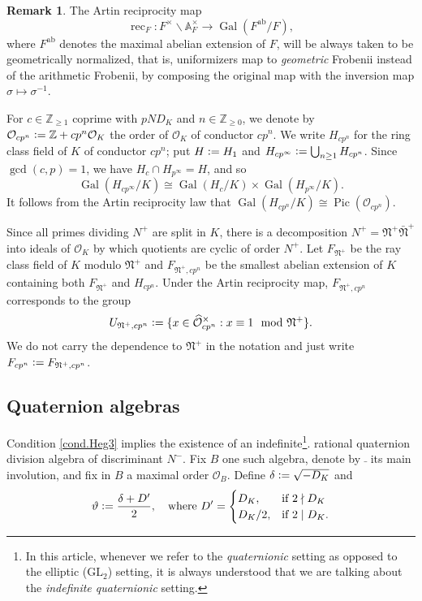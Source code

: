 \documentclass[a4paper]{amsart}
\makeatletter
\numberwithin{equation}{section}
\newcommand{\smallbullet}{}
\DeclareRobustCommand\smallbullet{
  \mathord{\mathpalette\smallbullet@{0.5}}
}
\newcommand{\smallbullet@}[2]{
  \vcenter{\hbox{\scalebox{#2}{$\m@th#1\bullet$}}}
}
\theoremstyle{definition}
\newtheorem{remark}[theorem]{Remark}
\newcommand{\Z}{\mathbb{Z}}
\newcommand{\A}{\mathbb{A}}
\newcommand{\defeq}{\vcentcolon=}
\DeclareMathOperator{\Pic}{Pic}
\DeclareMathOperator{\Gal}{Gal}
\makeatother
\begin{document}
\begin{remark}\label{rem.Reciprocity}
The Artin reciprocity map \[\operatorname{rec}_F\colon F^\times\backslash\A_F^\times\longrightarrow\Gal(F^{\mathrm{ab}}/F),\] where $F^\mathrm{ab}$ denotes the maximal abelian extension of $F$, will be always taken to be geometrically normalized, that is, uniformizers map to \textit{geometric} Frobenii instead of the arithmetic Frobenii, by composing the original map with the inversion map $\sigma\mapsto\sigma^{-1}$.
\end{remark}

For $c\in\Z_{\ge 1}$ coprime with $pND_K$ and $n\in\Z_{\ge 0}$, we denote by $\mathcal{O}_{cp^n}\defeq\Z +cp^n\mathcal{O}_K$ the order of $\mathcal{O}_K$ of conductor $cp^n$. We write $H_{cp^n}$ for the ring class field of $K$ of conductor $cp^n$; put $H\defeq H_{1}$ and $H_{cp^\infty}\defeq\bigcup_{n\ge 1}H_{cp^n}$.
Since $\gcd(c,p)=1$, we have $H_c\cap H_{p^\infty}=H$, and so \[\Gal(H_{cp^\infty}/K)\cong\Gal(H_c/K)\times\Gal(H_{p^\infty}/K).\] It follows from the Artin reciprocity law that $\Gal(H_{cp^n}/K)\cong\Pic(\mathcal{O}_{cp^n}).$

Since all primes dividing $N^+$ are split in $K$, there is a decomposition $N^+=\mathfrak{N}^+\bar{\mathfrak{N}}^+$ into ideals of $\mathcal{O}_K$ by which quotients are cyclic of order $N^+$. Let $F_{\mathfrak{N}^+}$ be the ray class field of $K$ modulo $\mathfrak{N}^+$ and $F_{\mathfrak{N}^+,cp^n}$ be the smallest abelian extension of $K$ containing both $F_{\mathfrak{N}^+}$ and $H_{cp^n}$. Under the Artin reciprocity map, 
$F_{\mathfrak{N}^+,cp^n}$ corresponds to the group 
\[U_{\mathfrak{N}^+,cp^n}\defeq\{x\in \widehat{\mathcal{O}}_{cp^n}^\times:x\equiv 1\mod \mathfrak{N}^{+}\}.\] We do not carry the dependence to $\mathfrak{N}^+$ in the notation and just write $F_{cp^n}\defeq F_{\mathfrak{N}^+,cp^n}$.

\subsection{Quaternion algebras}\label{subsec.QuaternionAlgebras}
Condition \ref{cond.Heg3} implies the existence of an indefinite\footnote{In this article, whenever we refer to the \textit{quaternionic} setting as opposed to the elliptic ($\mathrm{GL}_2$) setting, it is always understood that we are talking about the \textit{indefinite quaternionic} setting.}. rational quaternion division algebra of discriminant $N^{-}$. Fix $B$ one such algebra, denote by $\bar{\smallbullet}$ its main involution, and fix in $B$ a maximal order $\mathcal{O}_B$. Define $\delta\defeq\sqrt{-D_K}$ and
\begin{equation}\label{eq.vartheta}
\vartheta\defeq\dfrac{\delta+D'}{2},\hspace{10pt}\text{where }D'=\begin{cases} D_K, & \text{if }2\nmid D_K\\ D_K/2, & \text{if }2\mid D_K.\end{cases}
\end{equation}
\end{document}
